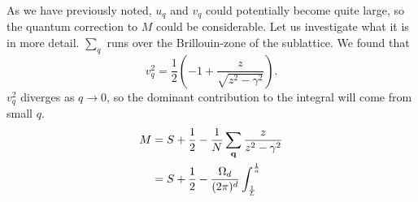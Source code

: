 As we have previously noted, $u_q$ and $v_q$ could potentially become quite large, so the quantum correction to $M$ could be considerable. Let us investigate what it is in more detail.
$\sum_q$ runs over the Brillouin-zone of the sublattice. We found that 
\begin{equation}
	v_q^2 = \frac{1}{2}\left (-1 + \frac{z}{\sqrt{z^2-\gamma^2}}\right ).
\end{equation}
$v_q^2$ diverges as $q\rightarrow0$, so the dominant contribution to the integral will come from small $q$. 
\begin{align}
	M &= S +\frac{1}{2} - \frac{1}{N}\sum_{\vb{q}}\frac{z}{z^2-\gamma^2}\\
	&= S + \frac{1}{2} -\frac{\Omega_d}{(2\pi)^d}\int_{\frac{1}{L}}^{\frac{1}{a}}
\end{align}